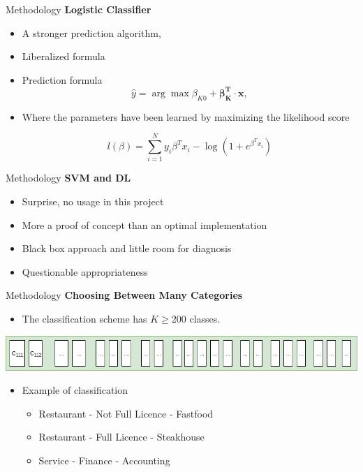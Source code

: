 \begin{frame}[label=metho]{Methodology}
	\textbf{Logistic Classifier}
	\begin{itemize}
		\item A stronger prediction algorithm, 
		\item Liberalized formula \cite{hastie2013elements}
		\item Prediction formula
$$ \hat{y} = \arg\max \beta_{K0} + \boldsymbol{\beta_{K}^T} \cdot  \boldsymbol{x} , $$
		\item Where the parameters have been learned by maximizing the likelihood score

	$$  l(\beta) = \sum_{i=1}^{N} y_i \beta^T x_i - \log(1+ e^{\beta^T x_i}) $$
		
	\end{itemize}
\end{frame}

\begin{frame}[label=metho]{Methodology}
	\textbf{SVM and DL}
	\begin{itemize}
		\item Surprise, no usage in this project
		\item More a proof of concept than an optimal implementation
		\item Black box approach and little room for diagnosis
		\item Questionable appropriateness
	\end{itemize}
\end{frame}


\begin{frame}[label=metho]{Methodology}
	\textbf{Choosing Between Many Categories}
	\begin{itemize}
		\item The classification scheme has $K \geq 200$ classes.
	\end{itemize}

\includegraphics[width=\textwidth]{images/bottom_level.png}
	
	\begin{itemize}
	\item Example of classification
\begin{itemize}
	\item Restaurant - Not Full Licence - Fastfood
	\item Restaurant - Full Licence - Steakhouse
	\item Service - Finance - Accounting
\end{itemize}
\end{itemize}



\end{frame}


